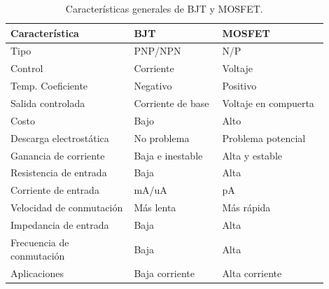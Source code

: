 \begin{table}[h]
    \centering
    \renewcommand{\arraystretch}{1.5}
    \begin{tabular}{p{0.35\linewidth}p{0.25\linewidth}p{0.30\linewidth}}
    \hline
        \textbf{Característica} & \textbf{BJT} & \textbf{MOSFET} \\ \hline
        Tipo & PNP/NPN & N/P \\ 
        Control & Corriente & Voltaje \\ 
        Temp. Coeficiente & Negativo & Positivo \\ 
        Salida controlada & Corriente de base & Voltaje en compuerta\\ 
        Costo & Bajo & Alto \\ 
        Descarga electrostática & No problema & Problema potencial \\ 
        Ganancia de corriente & Baja e inestable & Alta y estable \\ 
        Resistencia de entrada & Baja & Alta \\ 
        Corriente de entrada & mA/uA & pA \\ 
        Velocidad de conmutación & Más lenta & Más rápida \\ 
        Impedancia de entrada & Baja & Alta \\ 
        Frecuencia de conmutación & Baja & Alta \\ 
        Aplicaciones & Baja corriente & Alta corriente \\ \hline
    \end{tabular}
    \caption{Características generales de BJT y MOSFET.}
    \label{tab:comparisonbjtmosfet}
\end{table}

\vspace{1 cm}

